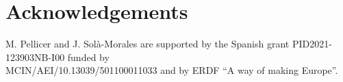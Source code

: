 \documentclass[a4paper]{article}
\numberwithin{equation}{section}
\begin{document}
\section{Acknowledgements}
M. Pellicer and J. Solà-Morales are supported by the Spanish grant PID2021-123903NB-I00 funded by \\ MCIN/AEI/10.13039/501100011033 and by ERDF ``A way of making Europe''.
\end{document}
